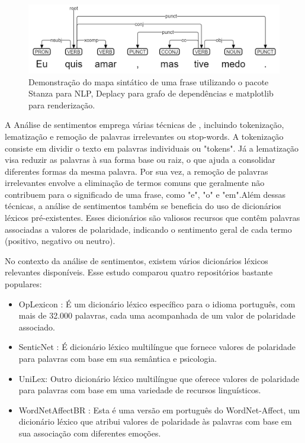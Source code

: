 \begin{figure}[!htb]
	\caption{Demonstração do mapa sintático de uma frase utilizando o pacote Stanza para NLP, Deplacy para grafo de dependências e matplotlib para renderização.}
	\label{fig:lexicon_breakdown}
	\centering
	\includegraphics[scale=0.5]{images/lexicon_breakdown.png}
	\fautor
\end{figure}

A Análise de sentimentos emprega várias técnicas de , incluindo tokenização, lematização e remoção de palavras irrelevantes ou stop-words. A tokenização consiste em dividir o texto em palavras individuais ou "tokens". Já a lematização visa reduzir as palavras à sua forma base ou raiz, o que ajuda a consolidar diferentes formas da mesma palavra. Por sua vez, a remoção de palavras irrelevantes envolve a eliminação de termos comuns que geralmente não contribuem para o significado de uma frase, como "e", "o" e "em".Além dessas técnicas, a análise de sentimentos também se beneficia do uso de dicionários léxicos pré-existentes. Esses dicionários são valiosos recursos que contêm palavras associadas a valores de polaridade, indicando o sentimento geral de cada termo (positivo, negativo ou neutro).

No contexto da análise de sentimentos, existem vários dicionários léxicos relevantes disponíveis. Esse estudo comparou quatro repositórios bastante populares:

\begin{itemize}
	\item OpLexicon \cite{2011_Souza_IP}: É um dicionário léxico específico para o idioma português, com mais de 32.000 palavras, cada uma acompanhada de um valor de polaridade associado.
	\item SenticNet \cite{2016_Cambria_IP}: É dicionário léxico multilíngue que fornece valores de polaridade para palavras com base em sua semântica e psicologia.
	\item UniLex: Outro dicionário léxico multilíngue que oferece valores de polaridade para palavras com base em uma variedade de recursos linguísticos.
	\item WordNetAffectBR \cite{2008_Pasqualotti}: Esta é uma versão em português do WordNet-Affect, um dicionário léxico que atribui valores de polaridade às palavras com base em sua associação com diferentes emoções.
\end{itemize}

